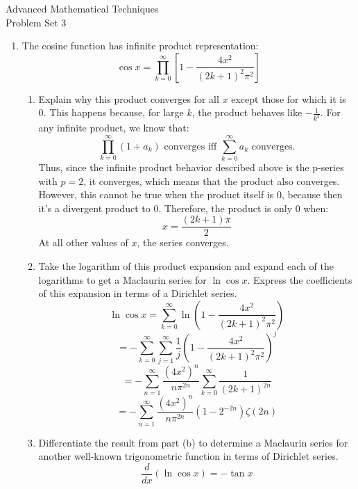 \documentclass{article}
\begin{document}
\thispagestyle{fancy}
\begin{center}\LARGE{Advanced Mathematical Techniques \\ Problem Set 3}\end{center}
\vspace{10mm}

\begin{enumerate}
    \item The cosine function has infinite product representation:
    \[\cos x = \prod_{k=0}^{\infty} \left[ 1 - \frac{4x^2}{(2k+1)^2\pi^2}\right]\]
    \begin{enumerate}
        \item Explain why this product converges for all $x$ except those for which it is 0.
        \newline \newline 
        This happens because, for large $k$, the product behaves like $ - \frac{1}{k^2}$. For any infinite product, we know that:
        \[\prod_{k=0}^{\infty} (1 + a_k) \text{ converges iff } \sum_{k=0}^{\infty} a_k \text{ converges.}\]
        Thus, since the infinite product behavior described above is the p-series with $p=2$, it converges, which means that the product also converges. 
        However, this cannot be true when the product itself is 0, because then it's a divergent product to 0. Therefore, the product is only 0 when:
        \[x = \frac{(2k+1)\pi}{2}\]
        At all other values of $x$, the series converges.
        \item Take the logarithm of this product expansion and expand each of the logarithms to get a Maclaurin series for $\ln \cos x$. Express the coefficients of this expansion in terms of a Dirichlet series.
        \newline \newline 
        \[\ln \cos x = \sum_{k=0}^{\infty} \ln \left( 1 - \frac{4x^2}{(2k+1)^2\pi^2}\right)\]
        \[ = -\sum_{k=0}^{\infty} \sum_{j=1}^{\infty} \frac{1}{j} \left(1- \frac{4x^2}{(2k+1)^2\pi^2}\right)^j\] 
        \[ = - \sum_{n=1}^{\infty} \frac{(4x^2)^n}{n\pi^{2n}}\sum_{k=0}^{\infty} \frac{1}{(2k+1)^{2n}}\]
        \[ = \boxed{-\sum_{n=1}^{\infty} \frac{(4x^2)^n}{n\pi^{2n}}(1-2^{-2n})\zeta(2n)}\]
        \item Differentiate the result from part (b) to determine a Maclaurin series for another well-known trigonometric function in terms of Dirichlet series.
        \newline \newline
        \[\frac{d}{dx}(\ln \cos x) = - \tan x\]

\end{enumerate}
\end{enumerate}
\end{document}
